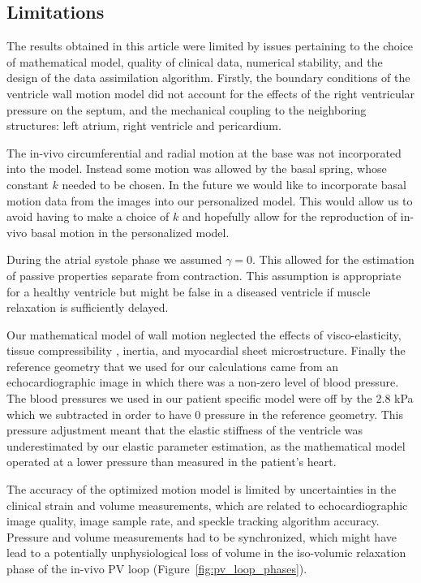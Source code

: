 \subsection{Limitations}
\label{sec:limitations}
The results obtained in this article were limited by issues pertaining
to the choice of mathematical model, quality of clinical data,
numerical stability, and the design of the data assimilation
algorithm.  Firstly, the boundary conditions of the ventricle wall
motion model did not account for the effects of the right ventricular
pressure on the septum, and the mechanical coupling to the
neighboring structures: left atrium, right ventricle and pericardium.

The in-vivo circumferential and radial motion at the base was not incorporated into the model.
Instead some motion was allowed by the basal spring, whose constant $k$ needed to be chosen.
In the future we would like to
incorporate basal motion data from the images into our personalized model. This would
allow us to avoid having to make a choice of $k$ and hopefully allow for the
reproduction of in-vivo basal motion in the personalized model.

During the atrial systole phase we assumed $\gamma = 0$. This allowed for 
the estimation of passive properties separate from contraction. This assumption 
is appropriate for a healthy ventricle but
might be false in a diseased ventricle if muscle relaxation is sufficiently delayed.

Our mathematical model of wall motion neglected the effects of
visco-elasticity, tissue compressibility \cite{yin1996compressibility},
inertia, and myocardial sheet
microstructure. Finally the reference geometry that we used for our
calculations came from an echocardiographic image in which there was a
non-zero level of blood pressure.  The blood pressures we used in our
patient specific model were off by the 2.8 kPa which we subtracted in
order to have 0 pressure in the reference geometry.  This pressure
adjustment meant that the elastic stiffness of the ventricle was
underestimated by our elastic parameter estimation, as the
mathematical model operated at a lower pressure than measured in the
patient's heart.

The accuracy of the optimized motion model is limited by uncertainties
in the clinical strain and volume measurements,
which are related to echocardiographic image quality,
image sample rate, and speckle tracking algorithm accuracy. 
Pressure and volume measurements had to be synchronized, which might
have lead to a potentially unphysiological loss of volume in the iso-volumic relaxation phase of
the in-vivo PV loop (Figure~\ref{fig:pv_loop_phases}).

